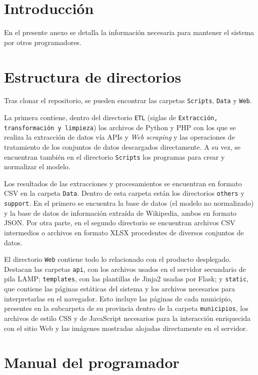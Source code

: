
\section{Introducción}

En el presente anexo se detalla la información necesaria para mantener el sistema por otros programadores.

\section{Estructura de directorios}

Tras clonar el repositorio, se pueden encontrar las carpetas \texttt{Scripts}, \texttt{Data} y \texttt{Web}.

La primera contiene, dentro del directorio \texttt{ETL} (siglas de \texttt{Extracción, transformación y limpieza}) los archivos de Python y PHP con los que se realiza la extracción de datos vía APIs y \textit{Web scraping} y las operaciones de tratamiento de los conjuntos de datos descargados directamente. A su vez, se encuentran también en el directorio \texttt{Scripts} los programas para crear y normalizar el modelo.

Los resultados de las extracciones y procesamientos se encuentran en formato CSV en la carpeta \texttt{Data}. Dentro de esta carpeta están los directorios \texttt{others} y \texttt{support}. En el primero se encuentra la base de datos (el modelo no normalizado) y la base de datos de información extraída de Wikipedia, ambos en formato JSON. Por otra parte, en el segundo directorio se encuentran archivos CSV intermedios o archivos en formato XLSX procedentes de diversos conjuntos de datos.

El directorio \texttt{Web} contiene todo lo relacionado con el producto desplegado. Destacan las carpetas \texttt{api}, con los archivos usados en el servidor secundario de pila LAMP; \texttt{templates}, con las plantillas de Jinja2 usadas por Flask; y \texttt{static}, que contiene las páginas estáticas del sistema y los archivos necesarios para interpretarlas en el navegador. Esto incluye las páginas de cada municipio, presentes en la subcarpeta de su provincia dentro de la carpeta \texttt{municipios}, los archivos de estilo CSS y de JavaScript necesarios para la interacción enriquecida con el sitio Web y las imágenes mostradas alojadas directamente en el servidor.

\section{Manual del programador}

